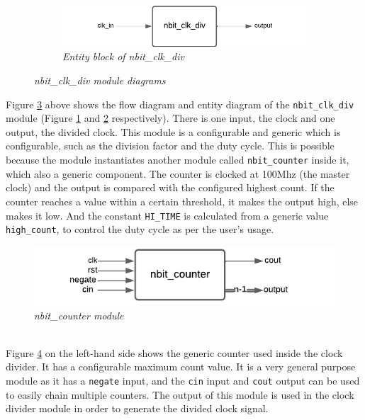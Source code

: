 \documentclass[aps, secnumarabic, balancelastpage, asmath, amssymb, nofootinbib, floatfix,]{revtex4-2}
\begin{document}
{\begin{figure}[h]
\begin{subfigure}{0.5\textwidth}
\label{fig:subim5}
\end{subfigure}
\begin{subfigure}{0.4\textwidth}
  \includegraphics[scale = 0.72]{clk_div.pdf}
  \caption{\em Entity block of nbit\_clk\_div}
  
\label{fig:subim6}
\end{subfigure}
\caption{\em nbit\_clk\_div module diagrams}
\label{fig:14}
\end{figure}

Figure \ref{fig:14} above shows the flow diagram and entity diagram of the \verb|nbit_clk_div| module (Figure \ref{fig:subim5} and \ref{fig:subim6} respectively). There is one input, the clock and one output, the divided clock. This module is a configurable and generic which is configurable, such as the division factor and the duty cycle. This is possible because the module instantiates another module called \verb|nbit_counter| inside it, which also a generic component. The counter is clocked at 100Mhz (the master clock) and the output is compared with the configured highest count. If the counter reaches a value within a certain threshold, it makes the output high, else makes it low. And the constant \verb|HI_TIME| is calculated from a generic value \verb|high_count|, to control the duty cycle as per the user's usage.

\begin{figure}
    \centering
    \includegraphics[scale = 0.8]{counter.pdf}
    \caption{\em nbit\_counter module}
    \label{fig:15}
\end{figure}
~\\
Figure \ref{fig:15} on the left-hand side shows the generic counter used inside the clock divider. It has a configurable maximum count value. It is a very general purpose module as it has a \verb|negate| input, and the \verb|cin| input and \verb|cout| output can be used to easily chain multiple counters. The output of this module is used in the clock divider module in order to generate the divided clock signal. 

}
\end{document}
